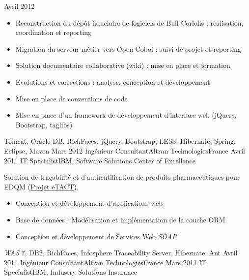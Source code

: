 \begin{experiences}
    {Avril 2012}    {
                      \begin{itemize}
                        \item Reconstruction du dépôt fiduciaire de logiciels de Bull Coriolis : réalisation, coordination et reporting
                        \item Migration du serveur métier vers Open Cobol : suivi de projet et reporting                
                        \item Solution documentaire collaborative (wiki) : mise en place et formation                   
                        \item Evolutions et corrections : analyse, conception et développement                          
                        \item Mise en place de conventions de code                                                      
                        \item Mise en place d'un framework de développement d'interface web (jQuery, Bootstrap, taglibs)
                      \end{itemize}
                    }
                    {Tomcat, Oracle DB, RichFaces, jQuery, Bootstrap, LESS, Hibernate, Spring, Eclipse, Maven}
  \emptySeparator
  \consultantexperience
  {Mars 2012}       {Ingénieur Consultant}{Altran Technologies}{France}
  {Avril 2011}      {IT Specialist}{IBM, Software Solutions Center of Excellence}
                    {
                      Solution de traçabilité et d'authentification de produits pharmaceutiques pour EDQM (\href{https://www.edqm.eu/fr/eTACT-1466.html}{Projet eTACT}).
                      \begin{itemize}
                        \item Conception et développement d'applications web                               
                        \item Base de données : Modélisation et implémentation de la couche ORM            
                        \item Conception et développement de Services Web \emph{SOAP}                      
                      \end{itemize}
                    }
                    {\emph{WAS} 7, DB2, RichFaces, Infosphere Traceability Server, Hibernate, Ant}
  \emptySeparator
  \consultantexperience
  {Avril 2011}      {Ingénieur Consultant}{Altran Technologies}{France}
  {Mars 2011}       {IT Specialist}{IBM, Industry Solutions Insurance}
                    {
}
\end{experiences}
